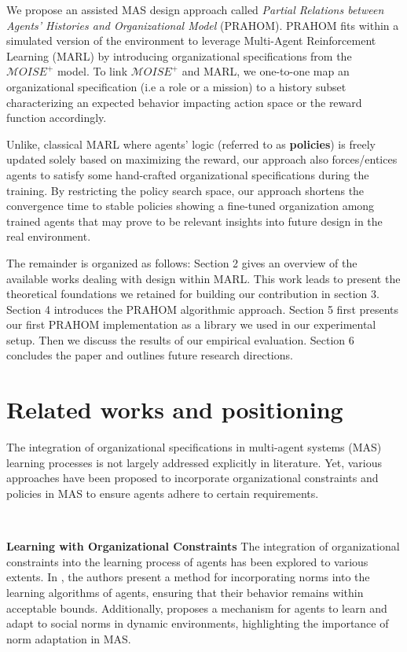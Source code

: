 \documentclass[runningheads]{llncs}
\theoremstyle{freethm}
\theoremstyle{proofoutline}
\begin{document}
We propose an assisted MAS design approach called \textit{Partial Relations between Agents' Histories and Organizational Model} (PRAHOM). PRAHOM fits within a simulated version of the environment to leverage Multi-Agent Reinforcement Learning (MARL) by introducing organizational specifications from the $\mathcal{M}OISE^+$ model. To link $\mathcal{M}OISE^+$ and MARL, we one-to-one map an organizational specification (i.e a role or a mission) to a history subset characterizing an expected behavior impacting action space or the reward function accordingly.

Unlike, classical MARL where agents' logic (referred to as \textbf{policies}) is freely updated solely based on maximizing the reward, our approach also forces/entices agents to satisfy some hand-crafted organizational specifications during the training. By restricting the policy search space, our approach shortens the convergence time to stable policies showing a fine-tuned organization among trained agents that may prove to be relevant insights into future design in the real environment.

The remainder is organized as follows: Section 2 gives an overview of the available works dealing with design within MARL. This work leads to present the theoretical foundations we retained for building our contribution in section 3. Section 4 introduces the PRAHOM algorithmic approach. Section 5 first presents our first PRAHOM implementation as a library we used in our experimental setup. Then we discuss the results of our empirical evaluation. Section 6 concludes the paper and outlines future research directions.


\section{Related works and positioning}

The integration of organizational specifications in multi-agent systems (MAS) learning processes is not largely addressed explicitly in literature. Yet, various approaches have been proposed to incorporate organizational constraints and policies in MAS to ensure agents adhere to certain requirements.

\

\textbf{Learning with Organizational Constraints} \quad
%
The integration of organizational constraints into the learning process of agents has been explored to various extents. In \cite{cruz2020norms}, the authors present a method for incorporating norms into the learning algorithms of agents, ensuring that their behavior remains within acceptable bounds. Additionally, \cite{villatoro2011social} proposes a mechanism for agents to learn and adapt to social norms in dynamic environments, highlighting the importance of norm adaptation in MAS.
\end{document}
